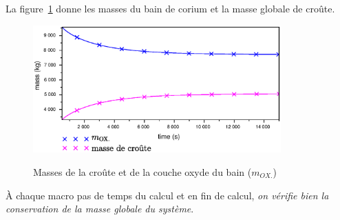 La figure~\ref{fig:mass_balance} donne les masses du bain de corium et la masse globale de croûte.
\begin{figure}[H]
\centering
\includegraphics[width=0.85\textwidth, keepaspectratio=true]{Figures/mass_balance.eps}\\
\caption{Masses de la croûte et de la couche oxyde du bain ($m_{OX.}$)}
\label{fig:mass_balance}
\end{figure}
À chaque macro pas de temps du calcul et en fin de calcul, \emph{on vérifie bien la conservation de la masse globale du système}.

